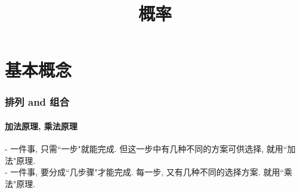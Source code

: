 \documentclass[UTF8]{ctexart}
\title{概率}
\begin{document}
	\tableofcontents %
	\date{} %
	\maketitle  %
	
	\part{基本概念}
	
	
	\section{排列 and 组合}
	
	\subsection{加法原理, 乘法原理}
	
	- 一件事, 只需``一步"就能完成. 但这一步中有几种不同的方案可供选择, 就用``加法"原理. \\	
	- 一件事, 要分成``几步骤"才能完成. 每一步, 又有几种不同的选择方案. 就用``乘法"原理. \\
	
\end{document}
